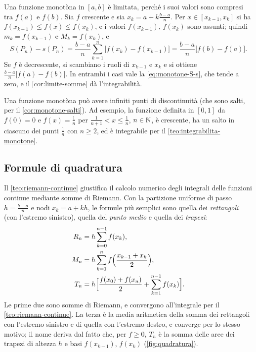 \begin{dimostrazione}
Una funzione monotòna in $[a,b]$ è limitata, perché i suoi valori sono compresi tra
$f(a)$ e $f(b)$. Sia $f$ crescente e sia $x_{k}=a+k\frac{b-a}n$. Per
$x\in[x_{k-1},x_{k}]$ si ha $f(x_{k-1})\le f(x)\le f(x_{k})$, e i valori $f(x_{k-1})$,
$f(x_{k})$ sono assunti; quindi $m_{k}=f(x_{k-1})$ e $M_{k}=f(x_{k})$, e
\[
  S(P_{n})-s(P_{n})=\frac{b-a}n\sum_{k=1}^{n}\bigl[f(x_{k})-f(x_{k-1})\bigr]
  =\frac{b-a}n\bigl[f(b)-f(a)\bigr] .
\]
Se $f$ è decrescente, si scambiano i ruoli di $x_{k-1}$ e $x_{k}$ e si ottiene
$\frac{b-a}n\bigl[f(a)-f(b)\bigr]$. In entrambi i casi vale la \eqref{eq:monotone-S-s}, che
tende a zero, e il \cref{cor:limite-somme} dà l'integrabilità.
\end{dimostrazione}

Una funzione monotòna può avere infiniti punti di discontinuità (che sono salti, per il
\cref{cor:monotone-salti}). Ad esempio, la funzione definita in $[0,1]$ da $f(0)=0$ e
$f(x)=\frac1n$ per $\frac1{n+1}<x\le\frac1n$, $n\in\mathbb{N}$, è crescente, ha un salto in ciascuno
dei punti $\frac1n$ con $n\ge2$, ed è integrabile per il \cref{teo:integrabilita-monotone}.

\subsection{Formule di quadratura}

Il \cref{teo:riemann-continue} giustifica il calcolo numerico degli integrali delle
funzioni continue mediante somme di Riemann. Con la partizione uniforme di passo
$h=\frac{b-a}n$ e nodi $x_{k}=a+kh$, le formule più semplici sono quella dei
\emph{rettangoli} (con l'estremo sinistro), quella del \emph{punto medio} e quella dei
\emph{trapezi}:
\begin{align}
  R_{n}&=h\sum_{k=0}^{n-1}f(x_{k}),
  \label{eq:quadratura-rettangoli}\\
  M_{n}&=h\sum_{k=1}^{n}f\Bigl(\frac{x_{k-1}+x_{k}}2\Bigr),
  \label{eq:quadratura-medio}\\
  T_{n}&=h\Bigl[\frac{f(x_{0})+f(x_{n})}2+\sum_{k=1}^{n-1}f(x_{k})\Bigr].
  \label{eq:quadratura-trapezi}
\end{align}
Le prime due sono somme di Riemann, e convergono all'integrale per il
\cref{teo:riemann-continue}. La terza è la media aritmetica della somma dei rettangoli
con l'estremo sinistro e di quella con l'estremo destro, e converge per lo stesso
motivo; il nome deriva dal fatto che, per $f\ge0$, $T_{n}$ è la somma delle aree dei
trapezi di altezza $h$ e basi $f(x_{k-1})$, $f(x_{k})$ (\cref{fig:quadratura}).

